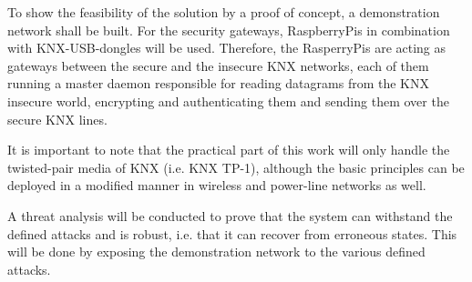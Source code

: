 \documentclass[a4paper,11pt,oneside]{memoir}
\begin{document}
To show the feasibility of the solution by a proof of concept, a demonstration network  shall be built.
For the security gateways, RaspberryPis in combination with KNX-USB-dongles will be used. Therefore, the RasperryPis
are acting as gateways between the secure and the insecure KNX networks, each of them running a master daemon responsible
for reading datagrams from the KNX insecure world, encrypting and authenticating them and sending them over the secure
KNX lines.





It is important to note that the practical part of this work will only
handle the twisted-pair media of KNX (i.e. KNX TP-1), although the basic principles can be deployed in a modified manner in
wireless and power-line networks as well.

A threat analysis will be conducted to prove that the system can withstand the defined attacks and is robust,
i.e. that it can recover from erroneous states. This will be done by exposing the demonstration network to the various defined attacks.  
\end{document}
